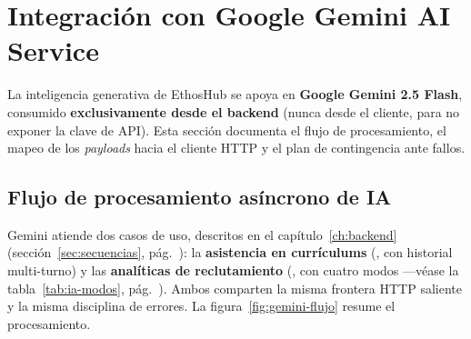 \section{Integración con Google Gemini AI Service}
\label{sec:int_gemini}

La inteligencia generativa de EthosHub se apoya en \textbf{Google Gemini 2.5 Flash},
consumido \textbf{exclusivamente desde el backend} (nunca desde el cliente, para no exponer
la clave de API). Esta sección documenta el flujo de procesamiento, el mapeo de los
\textit{payloads} hacia el cliente HTTP y el plan de contingencia ante fallos.

\subsection{Flujo de procesamiento asíncrono de IA}
\label{subsec:gemini_flujo}

Gemini atiende dos casos de uso, descritos en el capítulo~\ref{ch:backend}
(sección~\ref{sec:secuencias}, pág.~\pageref{sec:secuencias}): la \textbf{asistencia en
currículums} (, con historial multi-turno) y las \textbf{analíticas
de reclutamiento} (, con cuatro modos —véase la
tabla~\ref{tab:ia-modos}, pág.~\pageref{tab:ia-modos}). Ambos comparten la misma frontera
HTTP saliente y la misma disciplina de errores. La figura~\ref{fig:gemini-flujo} resume el
procesamiento.

